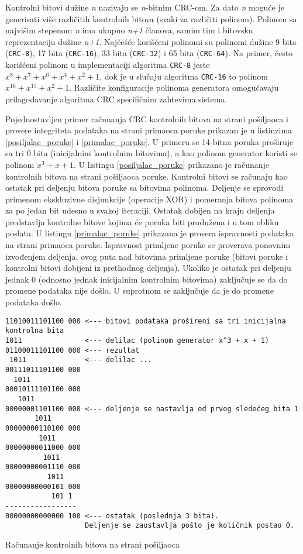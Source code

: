 \documentclass[12pt,oneside]{memoir}
\begin{document}
Kontrolni bitovi dužine \textit{n} nazivaju se \textit{n}-bitnim CRC-om. Za dato \textit{n} moguće je generisati više različitih kontrolnih bitova (svaki za različiti polinom). Polinom sa najvišim stepenom \textit{n} ima ukupno \textit{n+1} članova, samim tim i bitovsku reprezentaciju dužine \textit{n+1}. Najčešće korišćeni polinomi su polinomi dužine 9 bita (\texttt{CRC-8}), 17 bita (\texttt{CRC-16}), 33 bita (\texttt{CRC-32}) i 65 bita (\texttt{CRC-64}). Na primer, često korišćeni polinom u implementaciji algoritma \texttt{CRC-8} jeste $x^8 + x^7 + x^6 + x^4 + x^2 + 1$, dok je u slučaju algoritma \texttt{CRC-16} to polinom $x^{16} + x^{15} + x^2 + 1$. Različite konfiguracije polinoma generatora omogućavaju prilagođavanje algoritma CRC specifičnim zahtevima sistema.

Pojednostavljen primer računanja CRC kontrolnih bitova na strani pošiljaoca i provere integriteta podataka na strani primaoca poruke prikazan je u listinzima \ref{posiljalac_poruke} i \ref{primalac_poruke}. U primeru se 14-bitna poruka proširuje sa tri 0 bita (inicijalnim kontrolnim bitovima), a kao polinom generator koristi se polinom $x^3 + x + 1$. U listingu \ref{posiljalac_poruke} prikazano je računanje kontrolnih bitova na strani pošiljaoca poruke. Kontrolni bitovi se računaju kao ostatak pri deljenju bitova poruke sa bitovima polinoma. Deljenje se sprovodi primenom ekskluzivne disjunkcije (operacije XOR) i pomeranja bitova polinoma za po jedan bit udesno u svakoj iteraciji. Ostatak dobijen na kraju deljenja predstavlja kontrolne bitove kojima će poruka biti produžena i u tom obliku poslata. 
U listingu \ref{primalac_poruke} prikazana je provera ispravnosti podataka na strani primaoca poruke. Ispravnost primljene poruke se proverava ponovnim izvođenjem deljenja, ovog puta nad bitovima primljene poruke (bitovi poruke i kontrolni bitovi dobijeni iz prethodnog deljenja). Ukoliko je ostatak pri deljenju jednak 0 (odnosno jednak inicijalnim kontrolnim bitovima) zaključuje se da do promene podataka nije došlo. U suprotnom se zaključuje da je do promene podataka došlo.


\begin{listing}[!ht]
\begin{verbatim}
11010011101100 000 <--- bitovi podataka prošireni sa tri inicijalna kontrolna bita
1011               <--- delilac (polinom generator x^3 + x + 1)
01100011101100 000 <--- rezultat
 1011              <--- delilac ...
00111011101100 000
  1011
00010111101100 000
   1011
00000001101100 000 <--- deljenje se nastavlja od prvog sledećeg bita 1
       1011             
00000000110100 000
        1011
00000000011000 000
         1011
00000000001110 000
          1011
00000000000101 000
           101 1
-----------------
00000000000000 100 <--- ostatak (poslednja 3 bita). 
                   Deljenje se zaustavlja pošto je količnik postao 0. 
\end{verbatim}
\caption{Računanje kontrolnih bitova na strani pošiljaoca}
\label{posiljalac_poruke}
\end{listing}
\end{document}
